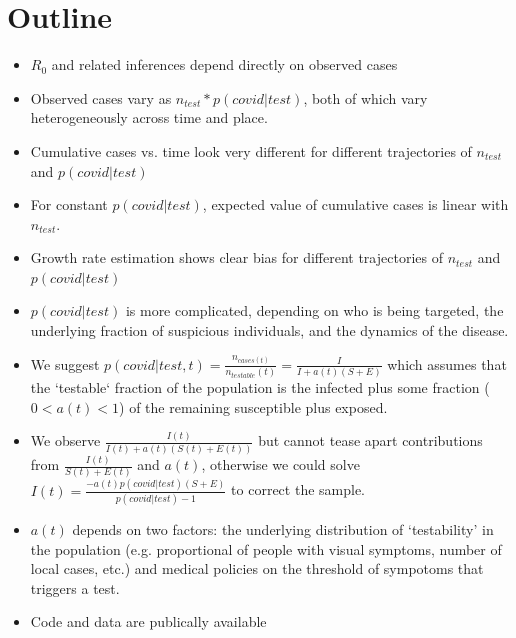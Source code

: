 \documentclass[11pt]{article}
\begin{document}
\section*{Outline}
\begin{itemize}
    \item $R_0$ and related inferences depend directly on observed cases
    
    \item Observed cases vary as $n_{test}*p(covid|test)$, both of which vary heterogeneously across time and place. 
    
    \item Cumulative cases vs. time look very different for different trajectories of $n_{test}$ and $p(covid|test)$
    
    \item For constant $p(covid|test)$, expected value of cumulative cases is linear with $n_{test}$.
    
    \item Growth rate estimation shows clear bias for different trajectories of $n_{test}$ and $p(covid|test)$
    
    \item $p(covid|test)$ is more complicated, depending on who is being targeted, the underlying fraction of suspicious individuals, and the dynamics of the disease.
    
    \item We suggest $p(covid|test,t) = \frac{n_{cases(t)}}{n_{testable}(t)}=\frac{I}{I+a(t)(S+E)}$ which assumes that the `testable` fraction of the population is the infected plus some fraction ($0<a(t)<1$) of the remaining susceptible plus exposed. 
    
    \item We observe $\frac{I(t)}{I(t)+a(t)(S(t)+E(t))}$ but cannot tease apart contributions from $\frac{I(t)}{S(t)+E(t)}$ and $a(t)$, otherwise we could solve $I(t) = \frac{-a(t)p(covid|test)(S+E)}{p(covid|test) - 1}$ to correct the sample.
    
    \item $a(t)$ depends on two factors: the underlying distribution of `testability' in the population (e.g. proportional of people with visual symptoms, number of local cases, etc.) and medical policies on the threshold of sympotoms that triggers a test.
    
    \item Code and data are publically available \href{ https://github.com/COVID-Weather/synthetic_observations}{}
\end{itemize}
\end{document}
